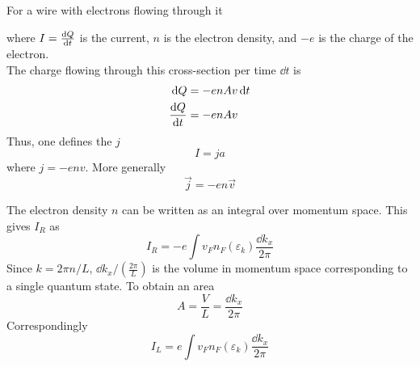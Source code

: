 \documentclass[12pt,a4paper,titlepage]{article}
\newcommand{\trm}[1]{\textrm{#1}} %
\newcommand{\ul}[1]{\underline{\smash{#1}}} %
\begin{document}
\begin{center}
\end{center}

For a wire with electrons flowing through it
\begin{center}
\end{center}
where $I=\dv{Q}{t}$ is the current, $n$ is the electron density, and $-e$ is the charge of the electron.\\

The charge flowing through this cross-section per time $\dd{t}$ is
\begin{equation}
\begin{aligned}
\dd{Q}&=-enAv\dd{t}\\
\dv{Q}{t}&=-enAv
\end{aligned}
\end{equation}
Thus, one defines the \ul{current density} $j$
\begin{equation}
I=ja
\end{equation}
where $j=-env$. More generally
\begin{equation}
\vec{j}=-en\vec{v}
\end{equation}

\begin{center}
\end{center}

The electron density $n$ can be written as an integral over momentum space. This gives $I_{R}$ as
\begin{equation}
I_{R}=-e\int v_{F}n_{F}(\varepsilon_{k}) \frac{\dd{k_{x}}}{2\pi}
\end{equation}
Since $k=2\pi n/L$, $\dd{k_{x}}/\left(\frac{2\pi}{L}\right)$ is the volume in momentum space corresponding to a single quantum state. To obtain an area
\begin{equation}
A=\frac{V}{L}=\frac{\dd{k_{x}}}{2\pi}
\end{equation}
Correspondingly
\begin{equation}
I_{L}=e\int v_{F}n_{F}(\varepsilon_{k}) \frac{\dd{k_{x}}}{2\pi}
\end{equation}
\end{document}
